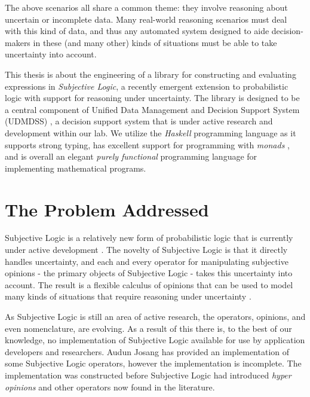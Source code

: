 \documentclass[thesis.tex]{subfiles}
\begin{document}
The above scenarios all share a common theme: they involve reasoning about uncertain or incomplete
data. Many real-world reasoning scenarios must deal with this kind of data, and thus any
automated system designed to aide decision-makers in these (and many other) kinds of situations must be able to take
uncertainty into account.

This thesis is about the engineering of a library for constructing and evaluating expressions in
\emph{Subjective Logic}, a recently emergent extension to probabilistic logic \cite{josang2001logic}
with support for reasoning under uncertainty.
The library is designed to be a central component of Unified Data Management
and Decision Support System (UDMDSS) \cite{kent2010towards,  kobti2011towards, kent2011design},
a decision support system that is under active research and development within our lab. We utilize the
\emph{Haskell} programming language \cite{hudak1992report} as it supports strong typing, has
excellent support for programming with \emph{monads} \cite{peyton1993imperative}, and is overall an
elegant \emph{purely functional} programming language for implementing mathematical programs.





\section{The Problem Addressed}

Subjective Logic is a relatively new form of probabilistic logic that is currently
under active development \cite{josang2001logic}. The novelty of Subjective Logic is that it
directly handles uncertainty, and each and every operator for manipulating
subjective opinions - the primary objects of Subjective Logic -
takes this uncertainty into account. The result is a
flexible calculus of opinions that can be used to model many kinds of
situations that require reasoning under uncertainty \cite{pope2005analysis, josang2006trust, li2004trust, oren2007subjective}.

As Subjective Logic is still an area of active research, the operators, opinions,
and even nomenclature, are evolving. As a result of this
there is, to the best of our knowledge, no implementation of Subjective
Logic available for use by application developers and researchers.
Audun Josang has provided an implementation of some Subjective Logic operators,
however the implementation is incomplete. The implementation was constructed before
Subjective Logic had introduced \emph{hyper opinions} and other operators now found
in the literature.
\end{document}
